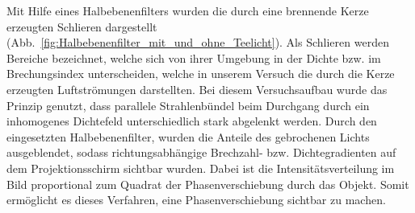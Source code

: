 Mit Hilfe eines Halbebenenfilters wurden die durch eine brennende Kerze erzeugten Schlieren dargestellt (Abb.~\ref{fig:Halbebenenfilter_mit_und_ohne_Teelicht}). Als Schlieren werden Bereiche bezeichnet, welche sich von ihrer Umgebung  in  der  Dichte  bzw.  im  Brechungsindex  unterscheiden,  welche  in  unserem Versuch die durch  die  Kerze erzeugten Luftströmungen darstellten. Bei diesem Versuchsaufbau  wurde  das  Prinzip  genutzt,  dass  parallele  Strahlenbündel  beim  Durchgang durch   ein   inhomogenes Dichtefeld   unterschiedlich   stark   abgelenkt   werden.   Durch   den eingesetzten  Halbebenenfilter,  wurden  die  Anteile  des  gebrochenen  Lichts  ausgeblendet,  sodass richtungsabhängige  Brechzahl-  bzw.  Dichtegradienten auf  dem  Projektionsschirm  sichtbar wurden. Dabei ist die Intensitätsverteilung im   Bild   proportional   zum   Quadrat   der Phasenverschiebung   durch   das   Objekt.   Somit   ermöglicht es dieses Verfahren, eine Phasenverschiebung sichtbar zu machen. 
